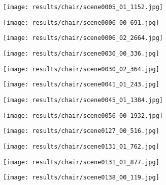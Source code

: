\begin{figure}[h!]
  \centering
  \begin{subfigure}[b]{0.32\linewidth}
    \texttt{[image: results/chair/scene0005\_01\_1152.jpg]}
  \end{subfigure}
  \begin{subfigure}[b]{0.32\linewidth}
    \texttt{[image: results/chair/scene0006\_00\_691.jpg]}
  \end{subfigure}
  \begin{subfigure}[b]{0.32\linewidth}
    \texttt{[image: results/chair/scene0006\_02\_2664.jpg]}
  \end{subfigure}
  \begin{subfigure}[b]{0.32\linewidth}
    \texttt{[image: results/chair/scene0030\_00\_336.jpg]}
  \end{subfigure}
  \begin{subfigure}[b]{0.32\linewidth}
    \texttt{[image: results/chair/scene0030\_02\_364.jpg]}
  \end{subfigure}
  \begin{subfigure}[b]{0.32\linewidth}
    \texttt{[image: results/chair/scene0041\_01\_243.jpg]}
  \end{subfigure}
  \begin{subfigure}[b]{0.32\linewidth}
    \texttt{[image: results/chair/scene0045\_01\_1384.jpg]}
  \end{subfigure}
  \begin{subfigure}[b]{0.32\linewidth}
    \texttt{[image: results/chair/scene0056\_00\_1932.jpg]}
  \end{subfigure}
  \begin{subfigure}[b]{0.32\linewidth}
    \texttt{[image: results/chair/scene0127\_00\_516.jpg]}
  \end{subfigure}
  \begin{subfigure}[b]{0.32\linewidth}
    \texttt{[image: results/chair/scene0131\_01\_762.jpg]}
  \end{subfigure}
  \begin{subfigure}[b]{0.32\linewidth}
    \texttt{[image: results/chair/scene0131\_01\_877.jpg]}
  \end{subfigure}
  \begin{subfigure}[b]{0.32\linewidth}
    \texttt{[image: results/chair/scene0138\_00\_119.jpg]}
  \end{subfigure}

\end{figure}
